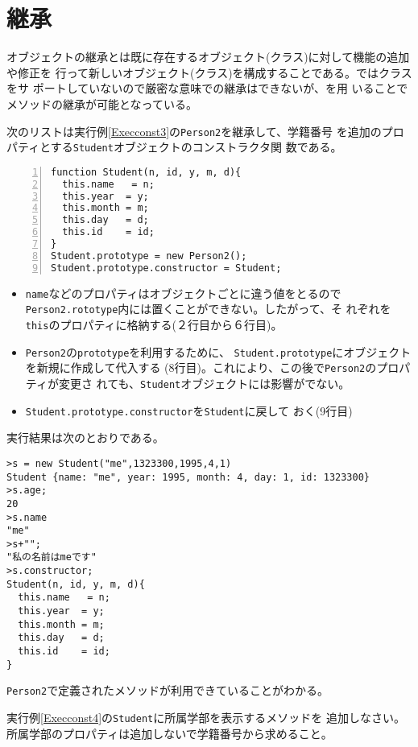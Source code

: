 \section{継承}
オブジェクトの継承とは既に存在するオブジェクト(クラス)に対して機能の追加や修正を
行って新しいオブジェクト(クラス)を構成することである。\JS ではクラスをサ
ポートしていないので厳密な意味での継承はできないが、を用
いることでメソッドの継承が可能となっている。
\begin{Exec}\upshape\label{Execconst4}
次のリストは実行例\ref{Execconst3}の\texttt{Person2}を継承して、学籍番号
 を追加のプロパティとする\texttt{Student}オブジェクトのコンストラクタ関
 数である。
\begin{Verbatim}[numbers=left]
function Student(n, id, y, m, d){
  this.name   = n;
  this.year  = y;
  this.month = m;
  this.day   = d;
  this.id    = id;
}
Student.prototype = new Person2();
Student.prototype.constructor = Student;
\end{Verbatim}
\end{Exec}
\begin{itemize}
 \item \texttt{name}などのプロパティはオブジェクトごとに違う値をとるので
       \texttt{Person2.rototype}内には置くことができない。したがって、そ
       れぞれを\texttt{this}のプロパティに格納する(２行目から６行目)。
 \item \texttt{Person2}の\texttt{prototype}を利用するために、
       \texttt{Student.prototype}にオブジェクトを新規に作成して代入する
       (8行目)。これにより、この後で\texttt{Person2}のプロパティが変更さ
       れても、\texttt{Student}オブジェクトには影響がでない。
 \item \texttt{Student.prototype.constructor}を\texttt{Student}に戻して
       おく(9行目)
\end{itemize}
実行結果は次のとおりである。
\begin{Verbatim}
>s = new Student("me",1323300,1995,4,1)
Student {name: "me", year: 1995, month: 4, day: 1, id: 1323300}
>s.age;
20
>s.name
"me"
>s+"";
"私の名前はmeです"
>s.constructor;
Student(n, id, y, m, d){
  this.name   = n;
  this.year  = y;
  this.month = m;
  this.day   = d;
  this.id    = id;
}
\end{Verbatim}
\texttt{Person2}で定義されたメソッドが利用できていることがわかる。
 \begin{Prob}\upshape
	実行例\ref{Execconst4}の\texttt{Student}に所属学部を表示するメソッドを
	追加しなさい。所属学部のプロパティは追加しないで学籍番号から求めること。
\end{Prob}
